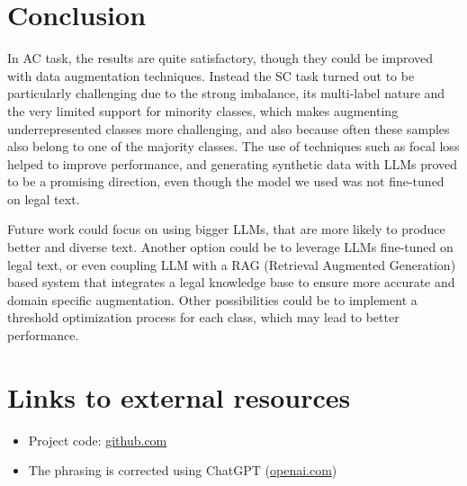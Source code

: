 \documentclass[11pt]{article}
\begin{document}
\section{Conclusion}
\label{sec:conclusion}

In AC task, the results are quite satisfactory, though they could be improved with data augmentation techniques. Instead the SC task turned out to be particularly challenging due to the strong imbalance, its multi-label nature and the very limited support for minority classes, which makes augmenting underrepresented classes more challenging, and also because often these samples also belong to one of the majority classes. The use of techniques such as focal loss helped to improve performance, and generating synthetic data with LLMs proved to be a promising direction, even though the model we used was not fine-tuned on legal text. 

Future work could focus on using bigger LLMs, that are more likely to produce better and diverse text. Another option could be to leverage LLMs fine-tuned on legal text, or even coupling LLM with a RAG (Retrieval Augmented Generation) based system that integrates a legal knowledge base to ensure more accurate and domain specific augmentation. Other possibilities could be to implement a threshold optimization process for each class, which may lead to better performance.


\section{Links to external resources}
\label{sec:links}

\begin{itemize}
    \item Project code: \href{https://github.com/Gh5al/VAT_ITA_classification}{github.com}
    \item The phrasing is corrected using ChatGPT (\href{https://chat.openai.com}{openai.com})

\end{itemize}
\end{document}
